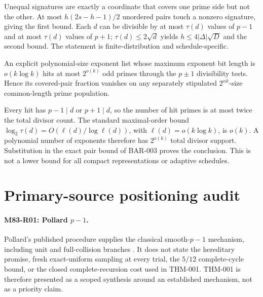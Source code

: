 \documentclass[11pt]{article}
\begin{document}
\begin{claimproof}
Unequal signatures are exactly a coordinate that covers one prime side but
not the other.  At most \(h(2s-h-1)/2\) unordered pairs touch a nonzero
signature, giving the first bound.  Each \(d\) can be divisible by at most
\(\tau(d)\) values of \(p-1\) and at most \(\tau(d)\) values of \(p+1\);
\(\tau(d)\le2\sqrt d\) yields \(h\le4|\Delta|\sqrt D\) and the second bound.
The statement is finite-distribution and schedule-specific.
\end{claimproof}

{}
An explicit polynomial-size exponent list
whose maximum exponent bit length is \(o(k\log k)\) hits at most
\(2^{o(k)}\) odd primes through the \(p\pm1\) divisibility tests.  Hence its
covered-pair fraction vanishes on any separately stipulated
\(2^{\alpha k}\)-size common-length prime population.

\begin{claimproof}
Every hit has \(p-1\mid d\) or \(p+1\mid d\), so the number of hit primes is
at most twice the total divisor count.  The standard maximal-order bound
\(\log_2\tau(d)=O(\ell(d)/\log\ell(d))\), with
\(\ell(d)=o(k\log k)\), is \(o(k)\).  A polynomial number of exponents
therefore has \(2^{o(k)}\) total divisor support.  Substitution in the exact
pair bound of BAR-003 proves the conclusion.  This is not a lower bound for
all compact representations or adaptive schedules.
\end{claimproof}

\appendix

\section{Primary-source positioning audit}
\label{app:promise-source-positioning}

\paragraph{M83-R01: Pollard \(p-1\).}
Pollard's published procedure supplies the classical smooth-\(p-1\)
mechanism, including unit and full-collision branches
\cite{pollard1974theorems}. It does not state the hereditary promise, fresh
exact-uniform sampling at every trial, the \(5/12\) complete-cycle bound, or
the closed complete-recursion cost used in THM-001. THM-001 is therefore
presented as a scoped synthesis around an established mechanism, not as a
priority claim.
\end{document}
